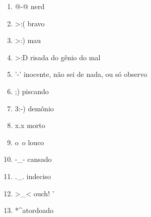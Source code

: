 \begin{enumerate}
\begin{enumerate}
\begin{enumerate}
			\item @-@ nerd
			\item >:( bravo
			\item >:) mau
			\item >:D risada do gênio do mal
			\item '-' inocente, não sei de nada, ou só observo
			\item ;) piscando
			\item 3:-) demônio
			\item x.x morto
			\item o~o louco
			\item -\_- cansado
			\item .\_. indeciso
			\item >\_< ouch!
'			\item *\textasciicircum* atordoado
		\end{enumerate}
	\end{enumerate}
\end{enumerate}
